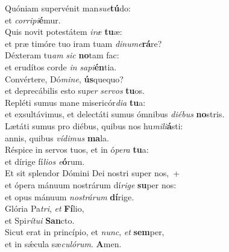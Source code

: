 \evenverse Quóniam supervénit man\textit{su}\textit{e}\textbf{tú}do:~\*\\
\evenverse et \textit{cor}\textit{ri}\textit{pi}\textbf{é}mur.\\
\oddverse Quis novit potestátem \textit{i}\textit{ræ} \textbf{tu}æ:~\*\\
\oddverse et præ timóre tuo iram tuam \textit{di}\textit{nu}\textit{me}\textbf{rá}re?\\
\evenverse Déxteram tu\textit{am} \textit{sic} \textbf{no}tam fac:~\*\\
\evenverse et erudítos corde \textit{in} \textit{sa}\textit{pi}\textbf{én}tia.\\
\oddverse Convértere, Dó\textit{mi}\textit{ne}, \textbf{ús}quequo?~\*\\
\oddverse et deprecábilis esto su\textit{per} \textit{ser}\textit{vos} \textbf{tu}os.\\
\evenverse Repléti sumus mane misericór\textit{di}\textit{a} \textbf{tu}a:~\*\\
\evenverse et exsultávimus, et delectáti sumus ómnibus \textit{di}\textit{é}\textit{bus} \textbf{no}stris.\\
\oddverse Lætáti sumus pro diébus, quibus nos hu\textit{mi}\textit{li}\textbf{á}sti:~\*\\
\oddverse annis, quibus \textit{ví}\textit{di}\textit{mus} \textbf{ma}la.\\
\evenverse Réspice in servos tuos, et in ó\textit{pe}\textit{ra} \textbf{tu}a:~\*\\
\evenverse et dírige fí\textit{li}\textit{os} \textit{e}\textbf{ó}rum.\\
\oddverse Et sit splendor Dómini Dei nostri super nos,~+\\
\oddverse  et ópera mánuum nostrárum dí\textit{ri}\textit{ge} \textbf{su}per nos:~\*\\
\oddverse et opus mánuum \textit{no}\textit{strá}\textit{rum} \textbf{dí}rige.\\
\evenverse Glória Pa\textit{tri}, \textit{et} \textbf{Fí}lio,~\*\\
\evenverse et Spi\textit{rí}\textit{tu}\textit{i} \textbf{San}cto.\\
\oddverse Sicut erat in princípio, et \textit{nunc}, \textit{et} \textbf{sem}per,~\*\\
\oddverse et in sǽcula sæ\textit{cu}\textit{ló}\textit{rum}. \textbf{A}men.\\
